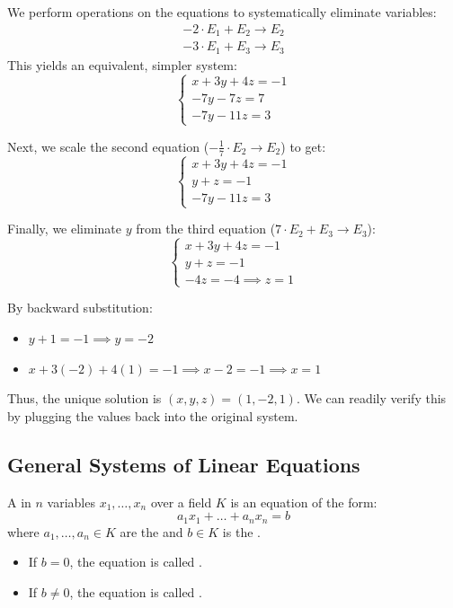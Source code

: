 We perform operations on the equations to systematically eliminate variables:
\begin{align*}
-2 \cdot E_1 + E_2 \to E_2 \\
-3 \cdot E_1 + E_3 \to E_3 
\end{align*}
This yields an equivalent, simpler system:
\begin{equation*}
\begin{cases}
x + 3y + 4z = -1 \\
-7y - 7z = 7 \\
-7y - 11z = 3
\end{cases}
\end{equation*}

Next, we scale the second equation ($-\frac{1}{7} \cdot E_2 \to E_2$) to get:
\begin{equation*}
\begin{cases}
x + 3y + 4z = -1 \\
y + z = -1 \\
-7y - 11z = 3
\end{cases}
\end{equation*}

Finally, we eliminate $y$ from the third equation ($7 \cdot E_2 + E_3 \to E_3$):
\begin{equation*}
\begin{cases}
x + 3y + 4z = -1 \\
y + z = -1 \\
-4z = -4 \implies z = 1
\end{cases}
\end{equation*}

By backward substitution:
\begin{itemize}
    \item $y + 1 = -1 \implies y = -2$
    \item $x + 3(-2) + 4(1) = -1 \implies x - 2 = -1 \implies x = 1$
\end{itemize}
Thus, the unique solution is $(x,y,z) = (1, -2, 1)$. We can readily verify this by plugging the values back into the original system.

\subsection{General Systems of Linear Equations}

\begin{definition}
A  in $n$ variables $x_1, \dots, x_n$ over a field $K$ is an equation of the form:
\[
a_1 x_1 + \dots + a_n x_n = b
\]
where $a_1, \dots, a_n \in K$ are the  and $b \in K$ is the .
\begin{itemize}
    \item If $b = 0$, the equation is called .
    \item If $b \ne 0$, the equation is called .
\end{itemize}
\end{definition}

